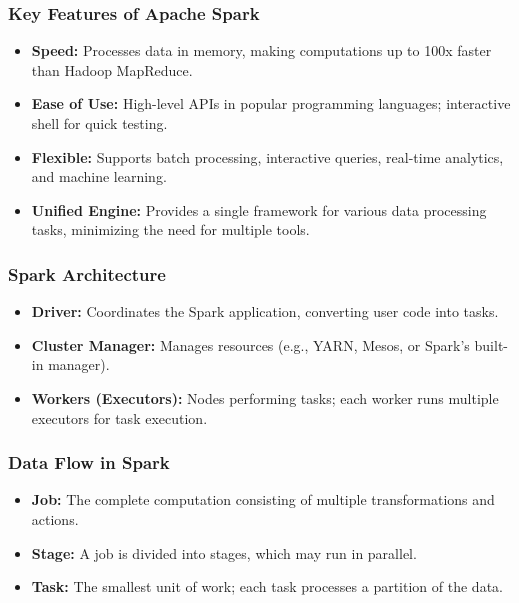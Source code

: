 \documentclass[aspectratio=169]{beamer}
\begin{document}
\begin{frame}[fragile]
  \frametitle{Key Features of Apache Spark}
  \begin{itemize}
    \item \textbf{Speed:} Processes data in memory, making computations up to 100x faster than Hadoop MapReduce.
    \item \textbf{Ease of Use:} High-level APIs in popular programming languages; interactive shell for quick testing.
    \item \textbf{Flexible:} Supports batch processing, interactive queries, real-time analytics, and machine learning.
    \item \textbf{Unified Engine:} Provides a single framework for various data processing tasks, minimizing the need for multiple tools.
  \end{itemize}
\end{frame}

\begin{frame}[fragile]
  \frametitle{Spark Architecture}
  \begin{itemize}
    \item \textbf{Driver:} Coordinates the Spark application, converting user code into tasks.
    \item \textbf{Cluster Manager:} Manages resources (e.g., YARN, Mesos, or Spark's built-in manager).
    \item \textbf{Workers (Executors):} Nodes performing tasks; each worker runs multiple executors for task execution.
  \end{itemize}
\end{frame}

\begin{frame}[fragile]
  \frametitle{Data Flow in Spark}
  \begin{itemize}
    \item \textbf{Job:} The complete computation consisting of multiple transformations and actions.
    \item \textbf{Stage:} A job is divided into stages, which may run in parallel.
    \item \textbf{Task:} The smallest unit of work; each task processes a partition of the data.
  \end{itemize}
\end{frame}
\end{document}
